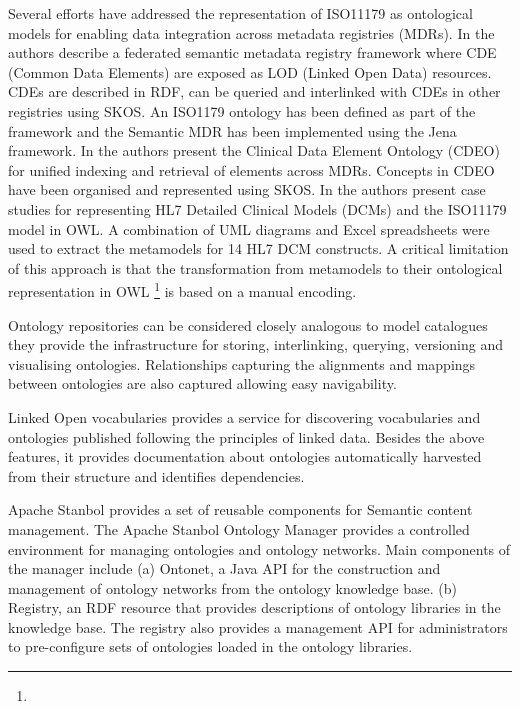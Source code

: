 


Several efforts have addressed the representation of ISO11179 as
ontological models for enabling data integration across metadata
registries (MDRs). In \cite{Sinaci2013784} the authors describe a
federated semantic metadata registry framework where CDE (Common Data
Elements) are exposed as LOD (Linked Open Data) resources. CDEs are
described in RDF, can be queried and interlinked with CDEs in other
registries using SKOS. An ISO1179 ontology has been defined as part of
the framework and the Semantic MDR has been implemented using the Jena
framework. In \cite{pmid25405066} the authors present the Clinical
Data Element Ontology (CDEO) for unified indexing and retrieval of
elements across MDRs. Concepts in CDEO have been organised and
represented using SKOS. In \cite{pmid22211181} the authors present
case studies for representing HL7 Detailed Clinical Models (DCMs) and
the ISO11179 model in OWL. A combination of UML diagrams and Excel
spreadsheets were used to extract the metamodels for 14 HL7 DCM
constructs. A critical limitation of this approach is that the
transformation from metamodels to their ontological representation in
OWL \footnote{} is based on a manual encoding.


Ontology repositories can be considered closely analogous to model
catalogues they provide the infrastructure for storing, interlinking,
querying, versioning and visualising ontologies. Relationships
capturing the alignments and mappings between ontologies are also
captured allowing easy navigability.

Linked Open vocabularies\cite{LOV} provides a service for discovering
vocabularies and ontologies published following the principles of
linked data. Besides the above features, it provides documentation
about ontologies automatically harvested from their structure and
identifies dependencies.

Apache Stanbol\cite{Stanbol} provides a set of reusable components for Semantic
content management.  The Apache Stanbol Ontology Manager provides a
controlled environment for managing ontologies and ontology
networks. Main components of the manager include (a) Ontonet, a Java
API for the construction and management of ontology networks from the
ontology knowledge base. (b) Registry, an RDF resource that provides
descriptions of ontology libraries in the knowledge base. The registry
also provides a management API for administrators to pre-configure
sets of ontologies loaded in the ontology libraries.

